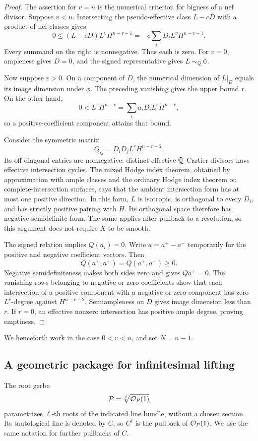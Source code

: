 \begin{proof}
The assertion for $v=n$ is the numerical criterion for bigness of a
nef divisor.  Suppose $v<n$.  Intersecting the pseudo-effective class
$L-cD$ with a product of nef classes gives
\[
 0\le (L-cD)L^vH^{n-v-1}
    =-c\sum_iD_iL^vH^{n-v-1}.
\]
Every summand on the right is nonnegative.  Thus each is zero.
For $v=0$, ampleness gives $D=0$, and the signed representative gives
$L\sim_{\mathbb{Q}}0$.

Now suppose $v>0$.  On a component of $D$, the numerical dimension
of $L|_D$ equals its image dimension under $\phi$.  The preceding
vanishing gives the upper bound $r$.  On the other hand,
\[
 0<L^vH^{n-v}=\sum_i a_iD_iL^rH^{n-v},
\]
so a positive-coefficient component attains that bound.

Consider the symmetric matrix
\[
 Q_{ij}=D_iD_jL^rH^{n-r-2}.
\]
Its off-diagonal entries are nonnegative: distinct effective
$\mathbb{Q}$-Cartier divisors have effective intersection cycles.  The mixed
Hodge index theorem, obtained by approximation with ample classes
and the ordinary Hodge index theorem on complete-intersection
surfaces, says that the ambient intersection form has at most one
positive direction.  In this form, $L$ is isotropic, is orthogonal
to every $D_i$, and has strictly positive pairing with $H$.
Its orthogonal space therefore has negative semidefinite form.
The same applies after pullback to a resolution, so this argument
does not require $X$ to be smooth.

The signed relation implies $Q(a_i)=0$.  Write $a=a^+-a^-$
temporarily for the positive and negative coefficient vectors.
Then
\[
 Q(a^+,a^+)=Q(a^+,a^-)\ge0.
\]
Negative semidefiniteness makes both sides zero and gives
$Qa^+=0$.  The vanishing rows belonging to negative or zero
coefficients show that each intersection of a positive component
with a negative or zero component has zero $L^r$-degree against
$H^{n-r-2}$.  Semiampleness on $D$ gives image dimension less than
$r$.  If $r=0$, an effective nonzero intersection has positive
ample degree, proving emptiness.
\end{proof}

We henceforth work in the case $0<v<n$, and set $N=n-1$.

\subsection{A geometric package for infinitesimal lifting}

The root gerbe
\[
 \mathcal P=\sqrt[\ell]{\mathcal{O}_P(1)}
\]
parametrizes $\ell$-th roots of the indicated line bundle, without
a chosen section.  Its tautological line is denoted by $C$, so
$C^\ell$ is the pullback of $\mathcal{O}_P(1)$.  We use the same notation
for further pullbacks of $C$.

